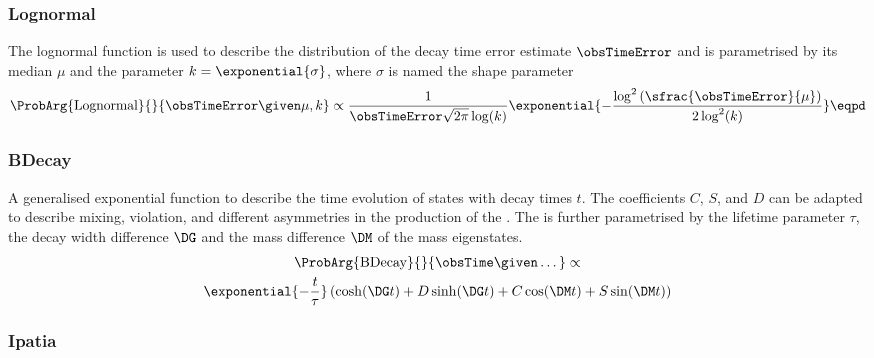 \subsubsection{Lognormal}
\label{sec:measurement_of_sin2beta:likelihood_fit:pdfs:lognormal}

The lognormal function is \eg used to describe the distribution of the decay
time error estimate $\obsTimeError$ and is parametrised by its median $\mu$ and
the parameter $k = \exponential{\sigma}$, where $\sigma$ is named the shape
parameter
%
\begin{equation}\label{eq:measurement_of_sin2beta:likelihood_fit:pdfs:lognormal}
  \ProbArg{\text{Lognormal}}{}{\obsTimeError \given \mu, k} \propto \frac{1}{\obsTimeError \sqrt{2\pi} \log (k)} \exponential{-\frac{\log^2 \left(\sfrac{\obsTimeError}{\mu}\right)}{2 \log^2(k)}}\eqpd
\end{equation}

\subsubsection{BDecay}
\label{sec:measurement_of_sin2beta:likelihood_fit:pdfs:bdecay}

A generalised exponential function to describe the time evolution of \Bmeson
states with decay times $t$. The coefficients $C$, $S$, and $D$ can be
adapted to describe \Bmeson mixing, \CP violation, and different asymmetries \eg
in the production of the \Bmesons. The \PDF is further parametrised by the
lifetime parameter $\tau$, the decay width difference $\DG$ and the mass
difference $\DM$ of the \Bmeson mass eigenstates.
%
\begin{multline}\label{eq:measurement_of_sin2beta:likelihood_fit:pdfs:bdecay}
  \ProbArg{\text{BDecay}}{}{\obsTime \given \dots} \propto \\ \exponential{- \frac{t}{\tau}}\left( \cosh (\DG t) + D \sinh (\DG t) + C \cos (\DM t) + S \sin (\DM t) \right)
\end{multline}

\subsubsection{Ipatia}
\label{sec:measurement_of_sin2beta:likelihood_fit:pdfs:ipatia}

